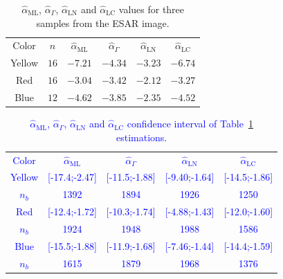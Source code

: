 \documentclass[twocolumn]{svjour3}
\begin{document}
	\begin{table}[hbt]
		\centering
		\caption{ $\widehat{\alpha}_{\text{{ML}}}$, $\widehat{\alpha}_{\Gamma}$, $\widehat{\alpha}_{\text{{LN}}}$ and $\widehat{\alpha}_{\text{{LC}}}$ values for three samples from the ESAR image.}\label{TablaTresMuestras}
		\begin{tabular}{c*5{c}}
			\toprule
			Color       &  $n$    &  $\widehat{\alpha}_{\text{{ML}}}$    &  $\widehat{\alpha}_{\Gamma}$  &  $\widehat{\alpha}_{\text{{LN}}}$ &  $\widehat{\alpha}_{\text{{LC}}}$\\
			\cmidrule(lr){1-6}
			Yellow      & $16$  & $-7.21$ & $-4.34$ & $-3.23$ & $-6.74$\\
			Red         & $16$  & $-3.04$ & $-3.42$ & $-2.12$ & $-3.27$\\
			Blue        & $12$  & $-4.62$ & $-3.85$ & $-2.35$ & $-4.52$\\
			\bottomrule
		\end{tabular}
	\end{table} 


	\begin{table}[hbt]
		\addtolength{\tabcolsep}{-4pt}
		\centering
		\caption{ $\widehat{\alpha}_{\text{{ML}}}$, $\widehat{\alpha}_{\Gamma}$, $\widehat{\alpha}_{\text{{LN}}}$ and $\widehat{\alpha}_{\text{{LC}}}$ confidence interval of Table~\ref{TablaTresMuestras} estimations.}\label{ICTresMuestras}
		\textcolor{blue}{
		\begin{tabular}{c*4{c}}
			\toprule
			Color       &  $\widehat{\alpha}_{\text{{ML}}}$    &  $\widehat{\alpha}_{\Gamma}$  &  $\widehat{\alpha}_{\text{{LN}}}$ &  $\widehat{\alpha}_{\text{{LC}}}$\\
			\cmidrule(lr){1-5}
			Yellow      & [-17.4;-2.47] & [-11.5;-1.88] & [-9.40;-1.64] & [-14.5;-1.86]\\
			$n_{b}$    & 1392          & 1894          & 1926          &  1250        \\
			\cmidrule(lr){1-5}
			Red         & [-12.4;-1.72] & [-10.3;-1.74] & [-4.88;-1.43] & [-12.0;-1.60]\\
			$n_{b}$    & 1924          & 1948          & 1988          & 1586         \\
			\cmidrule(lr){1-5}
			Blue        & [-15.5;-1.88] & [-11.9;-1.68] & [-7.46;-1.44] & [-14.4;-1.59]\\
			$n_{b}$    & 1615          & 1879          & 1968          & 1376         \\
			\bottomrule
		\end{tabular}
	}
	\end{table} 
	
\end{document}
